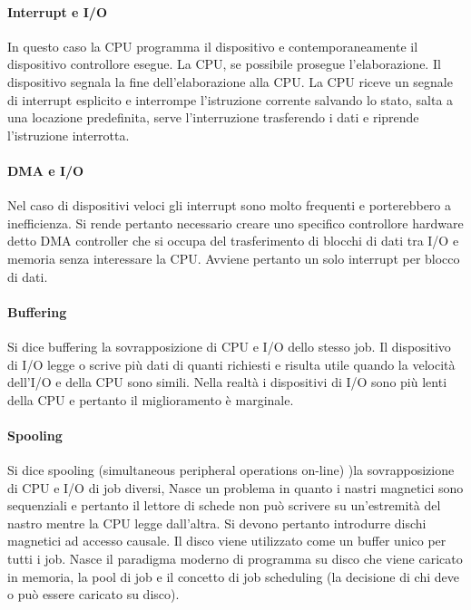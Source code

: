 \paragraph{Interrupt e I/O}
In questo caso la CPU programma il dispositivo e contemporaneamente il dispositivo controllore esegue. La CPU, se possibile prosegue l'elaborazione. Il dispositivo segnala la fine dell'elaborazione alla CPU. La
CPU riceve un segnale di interrupt esplicito e interrompe l'istruzione corrente salvando lo stato, salta a una locazione predefinita, serve l'interruzione trasferendo i dati e riprende l'istruzione interrotta.
\paragraph{DMA e I/O}
Nel caso di dispositivi veloci gli interrupt sono molto frequenti e porterebbero a inefficienza. Si rende pertanto necessario creare uno specifico controllore hardware detto DMA controller che si occupa del
trasferimento di blocchi di dati tra I/O e memoria senza interessare la CPU. Avviene pertanto un solo interrupt per blocco di dati.
\paragraph{Buffering}
Si dice buffering la sovrapposizione di CPU e I/O dello stesso job. Il dispositivo di I/O legge o scrive pi\`u dati di quanti richiesti e risulta utile quando la velocit\`a dell'I/O e della CPU sono simili. Nella realt\`a i
dispositivi di I/O sono pi\`u lenti della CPU e pertanto il miglioramento \`e marginale.
\paragraph{Spooling}
Si dice spooling (simultaneous peripheral operations on-line) )la sovrapposizione di CPU e I/O di job diversi, Nasce un problema in quanto i nastri magnetici sono sequenziali e pertanto il lettore di schede non
pu\`o scrivere su un'estremit\`a del nastro mentre la CPU legge dall'altra. Si devono pertanto introdurre dischi magnetici ad accesso causale. Il disco viene utilizzato come un buffer unico per tutti i job. Nasce
il paradigma moderno di programma su disco che viene caricato in memoria, la pool di job e il concetto di job scheduling (la decisione di chi deve o pu\`o essere caricato su disco).
